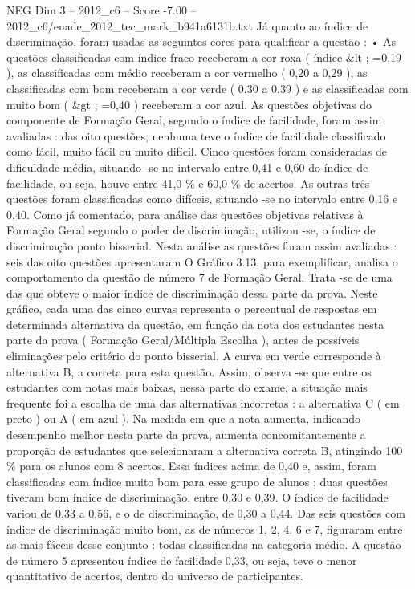 \begin{textsample}{NEG Dim 3 – 2012\_c6 – Score -7.00 – 2012\_c6/enade\_2012\_tec\_mark\_b941a6131b.txt}
Já quanto ao índice de discriminação, foram usadas as seguintes cores para qualificar a questão : • As questões classificadas com índice fraco receberam a cor roxa ( índice \&lt ; =0,19 ), as classificadas com médio receberam a cor vermelho ( 0,20 a 0,29 ), as classificadas com bom receberam a cor verde ( 0,30 a 0,39 ) e as classificadas com muito bom ( \&gt ; =0,40 ) receberam a cor azul.
As questões objetivas do componente de Formação Geral, segundo o índice de facilidade, foram assim avaliadas : das oito questões, nenhuma teve o índice de facilidade classificado como fácil, muito fácil ou muito difícil.
Cinco questões foram consideradas de dificuldade média, situando -se no intervalo entre 0,41 e 0,60 do índice de facilidade, ou seja, houve entre 41,0 \% e 60,0 \% de acertos.
As outras três questões foram classificadas como difíceis, situando -se no intervalo entre 0,16 e 0,40.
Como já comentado, para análise das questões objetivas relativas à Formação Geral segundo o poder de discriminação, utilizou -se, o índice de discriminação ponto bisserial.
Nesta análise as questões foram assim avaliadas : seis das oito questões apresentaram O Gráfico 3.13, para exemplificar, analisa o comportamento da questão de número 7 de Formação Geral.
Trata -se de uma das que obteve o maior índice de discriminação dessa parte da prova.
Neste gráfico, cada uma das cinco curvas representa o percentual de respostas em determinada alternativa da questão, em função da nota dos estudantes nesta parte da prova ( Formação Geral/Múltipla Escolha ), antes de possíveis eliminações pelo critério do ponto bisserial.
A curva em verde corresponde à alternativa B, a correta para esta questão.
Assim, observa -se que entre os estudantes com notas mais baixas, nessa parte do exame, a situação mais frequente foi a escolha de uma das alternativas incorretas : a alternativa C ( em preto ) ou A ( em azul ).
Na medida em que a nota aumenta, indicando desempenho melhor nesta parte da prova, aumenta concomitantemente a proporção de estudantes que selecionaram a alternativa correta B, atingindo 100 \% para os alunos com 8 acertos.
Essa índices acima de 0,40 e, assim, foram classificadas com índice muito bom para esse grupo de alunos ; duas questões tiveram bom índice de discriminação, entre 0,30 e 0,39.
O índice de facilidade variou de 0,33 a 0,56, e o de discriminação, de 0,30 a 0,44.
Das seis questões com índice de discriminação muito bom, as de números 1, 2, 4, 6 e 7, figuraram entre as mais fáceis desse conjunto : todas classificadas na categoria médio.
A questão de número 5 apresentou índice de facilidade 0,33, ou seja, teve o menor quantitativo de acertos, dentro do universo de participantes.

\end{textsample}
